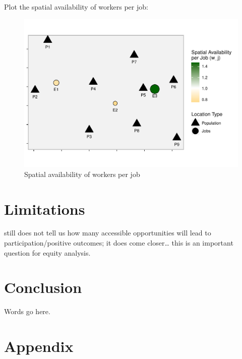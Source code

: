\documentclass[]{elsarticle} %
\begin{document}
Plot the spatial availability of workers per job:

\begin{figure}
\includegraphics[width=1\linewidth]{Spatial-Availability_files/figure-latex/toy-example-availability-workers-per-job-1} \caption{\label{fig:toy-example-availability-workers-per-job}Spatial availability of workers per job}\label{fig:toy-example-availability-workers-per-job}
\end{figure}

\hypertarget{limitations}{%
\section{Limitations}\label{limitations}}

still does not tell us how many accessible opportunities will lead to
participation/positive outcomes; it does come closer\ldots{} this is an
important question for equity analysis.

\hypertarget{conclusion}{%
\section{Conclusion}\label{conclusion}}

Words go here.

\hypertarget{appendix}{%
\section{Appendix}\label{appendix}}
\end{document}
